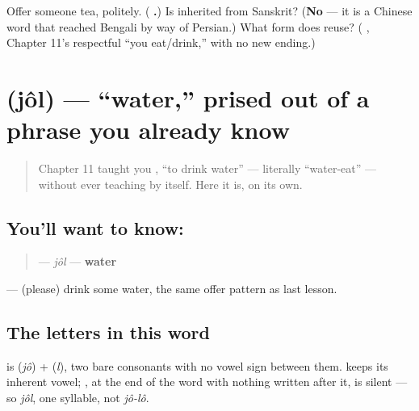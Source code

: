 \begin{tcolorbox}[breakable,colback=teal!4,colframe=teal!35!black,title={Before you move on}]
Offer someone tea, politely. (\textbf{ .}) Is  inherited from Sanskrit? (\textbf{No} — it is a Chinese word that reached Bengali by way of Persian.) What form does   reuse? (\textbf{ }, Chapter 11's respectful \textquotedblleft{}you eat/drink,\textquotedblright{} with no new ending.)
\end{tcolorbox}
\section[jôl]{ (jôl) — \textquotedblleft{}water,\textquotedblright{} prised out of a phrase you already know}

\label{lesson:BN-C10-jol}



\begin{quote}
Chapter 11 taught you \textbf{ }, \textquotedblleft{}to drink water\textquotedblright{} — literally \textquotedblleft{}water-eat\textquotedblright{} — without ever teaching  by itself. Here it is, on its own.
\end{quote}

\subsection*{You'll want to know: }
\begin{quote}
\textbf{} — \emph{jôl} — \textbf{water}
\end{quote}

\textbf{ } — (please) drink some water, the same offer pattern as last lesson.

\subsection*{The letters in this word}
\textbf{} is \textbf{} (\emph{jô}) + \textbf{} (\emph{l}), two bare consonants with no vowel sign between them. \textbf{} keeps its inherent vowel; \textbf{}, at the end of the word with nothing written after it, is silent — so \emph{jôl}, one syllable, not \emph{jô-lô}.

